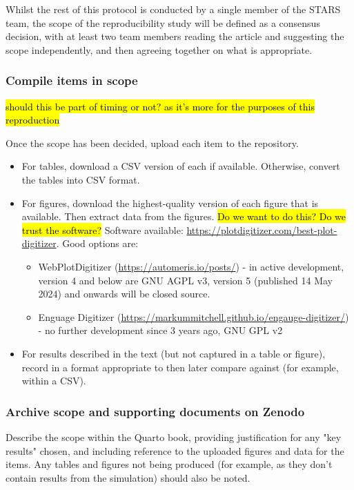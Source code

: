 Whilst the rest of this protocol is conducted by a single member of the STARS team, the scope of the reproducibility study will be defined as a consensus decision, with at least two team members reading the article and suggesting the scope independently, and then agreeing together on what is appropriate.

\subsubsection{Compile items in scope}
\timeyes

\hl{should this be part of timing or not? as it's more for the purposes of this reproduction}

Once the scope has been decided, upload each item to the repository.

\begin{itemize}
    \item For tables, download a CSV version of each if available. Otherwise, convert the tables into CSV format.
    \item For figures, download the highest-quality version of each figure that is available. Then extract data from the figures. \hl{Do we want to do this? Do we trust the software?} Software available: \url{https://plotdigitizer.com/best-plot-digitizer}. Good options are:
    \begin{itemize}
        \item WebPlotDigitizer (\url{https://automeris.io/posts/}) - in active development, version 4 and below are GNU AGPL v3, version 5 (published 14 May 2024) and onwards will be closed source.
        \item Enguage Digitizer (\url{https://markummitchell.github.io/engauge-digitizer/}) - no further development since 3 years ago, GNU GPL v2
    \end{itemize}
    \item For results described in the text (but not captured in a table or figure), record in a format appropriate to then later compare against (for example, within a CSV).
\end{itemize}

\subsubsection{Archive scope and supporting documents on Zenodo}
\timeyes

Describe the scope within the Quarto book, providing justification for any "key results" chosen, and including reference to the uploaded figures and data for the items. Any tables and figures not being produced (for example, as they don't contain results from the simulation) should also be noted.

